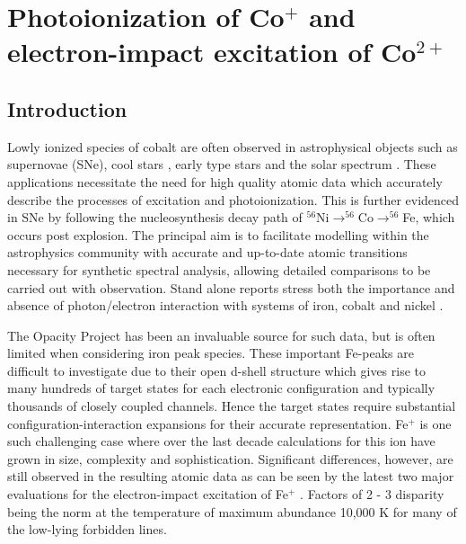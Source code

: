 
\chapter{Photoionization of Co$^{+}$ and electron-impact excitation of Co$^{2+}$} 
\label{cha:cobalt} 


\section{Introduction}\label{sec:co_introduction}
Lowly ionized species of cobalt are often observed in astrophysical objects such as supernovae (SNe), cool stars \citep{2010MNRAS.401.1334B}, early type stars \citep{1993A&A...274..335S} and the solar spectrum \citep{1998ApJS..117..261P}. These applications necessitate the need for high quality atomic data which accurately describe the processes of excitation and photoionization. This is further evidenced in SNe by following the nucleosynthesis decay path of $^{56}$Ni$\rightarrow ^{56}$Co$\rightarrow ^{56}$Fe, which occurs post explosion. The principal aim is to facilitate modelling within the astrophysics community with accurate and up-to-date atomic transitions necessary for synthetic spectral analysis, allowing detailed comparisons to be carried out with observation. Stand alone reports stress both the importance and absence of photon/electron interaction with systems of iron, cobalt and nickel \citep{1995ASPC...78..291R, 2011Ap&SS.336...87H, 2014MNRAS.441.3249D}. 

The Opacity Project has been an invaluable source for such data, but is often limited when considering iron peak species. These important Fe-peaks are difficult to investigate due to their open d-shell structure which gives rise to many hundreds of target states for each electronic configuration and typically thousands of closely coupled channels. Hence the target states require substantial configuration-interaction expansions for their accurate representation. Fe$^{+}$ is one such challenging case where over the last decade calculations for this ion have grown in size, complexity and sophistication. Significant differences, however, are still observed in the resulting atomic data as can be seen by the latest two major evaluations for the electron-impact excitation of Fe$^{+}$ \citep{2007A&A...475..765R, 2015ApJ...808..174B}. Factors of 2 - 3 disparity being the norm at the temperature of maximum abundance 10,000 K for many of the low-lying forbidden lines.

